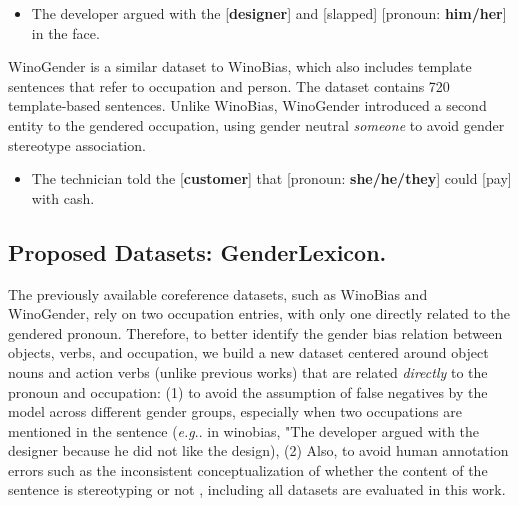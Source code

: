 \documentclass[11pt]{article}
\makeatletter
\def\eg{\emph{e.g}\onedot} \def\Eg{\emph{E.g}\onedot}
\DeclareRobustCommand\eg{%
  \UKUS@comma{e.g}%
}
\DeclareRobustCommand\onedot{\futurelet\@let@token\@onedot}
\def\@onedot{\ifx\@let@token.\else.\null\fi\xspace}
\DeclareRobustCommand\onedot{\futurelet\@let@token\@onedot}
\def\@onedot{\ifx\@let@token.\else.\null\fi\xspace}
\DeclareRobustCommand\onedot{\futurelet\@let@token\@onedot}
\def\@onedot{\ifx\@let@token.\else.\null\fi\xspace}
\def\eg{\emph{e.g}\onedot} \def\Eg{\emph{E.g}\onedot}
\makeatother
\begin{document}
\begin{itemize}
        

              \item [] The developer argued with the [\textbf{designer}] and [slapped] [pronoun: \textbf{him/her}] in the face.
    

    
\end{itemize}


 WinoGender is a similar dataset to WinoBias, which also includes template sentences that refer to occupation and person. The dataset contains 720 template-based sentences. Unlike WinoBias,  WinoGender introduced a second entity to the gendered occupation, using gender neutral \textit{someone} to avoid gender stereotype association.


\begin{itemize}
        \item [] The technician told the [\textbf{customer}] that [pronoun: \textbf{she/he/they}] could [pay] with cash.     
\end{itemize}

\subsection{Proposed Datasets: GenderLexicon.}
The previously available coreference datasets, such as WinoBias and WinoGender, rely on two occupation entries, with only one directly related to the gendered pronoun. Therefore, to better identify the gender bias relation between objects, verbs, and occupation, we build a new dataset centered around object nouns and action verbs (unlike previous works) that are related \textit{directly} to the pronoun and occupation:  (1) to avoid the assumption of false negatives by the model across different gender groups, especially when two occupations are mentioned in the sentence (\eg in winobias, "The developer argued with the designer because he did not like the design), (2) Also, to avoid human annotation errors such as the inconsistent conceptualization of whether the content of the sentence is stereotyping or not \cite{blodgett2021stereotyping}, including all datasets are evaluated in this work.  
\end{document}
